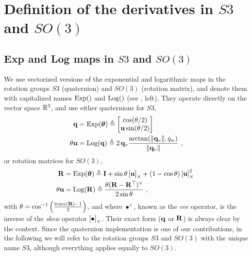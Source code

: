 
\appendices


\small

\section{Definition of the derivatives in $S3$ and $SO(3)$}
\label{sec:derivatives_SO3}


\subsection{Exp and Log maps in $S3$ and $SO(3)$}

We use vectorized versions of the exponential and logarithmic maps in the rotation groups $S3$ (quaternion) and $SO(3)$ (rotation matrix), and denote them with capitalized names $\operatorname*{Exp}()$ and $\operatorname*{Log}()$ (see , left). They operate directly on the vector space ${\mathbb R}^3$, and use either quaternions for $S3$,
%
\begin{subequations}
\begin{align}
{\bf q}
&= \operatorname*{Exp}({{\bm \theta}}) \triangleq \begin{bmatrix}
\cos(\theta/2) \\ {\bf u}\sin(\theta/2)
\end{bmatrix}\\ 
\theta{\bf u} &= \operatorname*{Log}({\bf q}) \triangleq 2\,{{\bf q}_v}\frac{\arctan({{\left\|{{\bf q}_v}\right\|},q_w})}{{\left\|{{\bf q}_v}\right\|}}
~,
\end{align}
\end{subequations}
%
or rotation matrices for $SO(3)$, 
%
\begin{subequations}
\begin{align}
{\bf R}
&= \operatorname*{Exp}({{\bm \theta}}) \triangleq {\bf I} + \sin\theta\left[{\bf u}\right]_\times + (1-\cos\theta)\left[{\bf u}\right]_\times^2~ \label{equ:rodrigues} \\ 
\theta{\bf u} &= \operatorname*{Log}({\bf R}) \triangleq \frac{\theta({\bf R}-{\bf R}^{\top})^\vee}{2\sin\theta} 
~,
\end{align}
\end{subequations}
%
with $\theta=\cos^{-1}\left(\frac{\operatorname*{trace}({\bf R})-1}{2}\right)$,
and where $\bullet^\vee$, known as the \emph{vee} operator, is the inverse of the \emph{skew} operator $\left[\bullet\right]_\times$. 
Their exact form (${\bf q}$ or ${\bf R}$) is always clear by the context.
Since the quaternion implementation is one of our contributions, in the following we will refer to the rotation groups $S3$ and $SO(3)$ with the unique name $S3$, although everything applies equally to $SO(3)$. 




